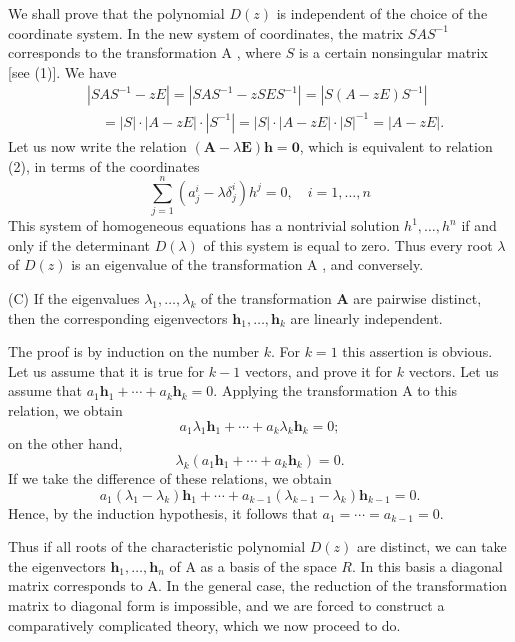 \documentclass[10pt,a5paper]{book}
\theoremstyle{plain}
\theoremstyle{definition}
\theoremstyle{remark}
\begin{document}
We shall prove that the polynomial $D(z)$ is independent of the choice of the coordinate system. In the new system of coordinates, the matrix $S A S^{-1}$ corresponds to the transformation A , where $S$ is a certain nonsingular matrix [see (1)]. We have
\[
\begin{aligned}
& \left|S A S^{-1}-z E\right|=\left|S A S^{-1}-z S E S^{-1}\right|=\left|S(A-z E) S^{-1}\right| \\
& \quad=|S| \cdot|A-z E| \cdot\left|S^{-1}\right|=|S| \cdot|A-z E| \cdot|S|^{-1}=|A-z E| .
\end{aligned}
\]
Let us now write the relation $(\mathbf{A}-\lambda \mathbf{E}) \mathbf{h}=\mathbf{0}$, which is equivalent to relation (2), in terms of the coordinates
\[
\sum_{j=1}^{n}\left(a_{j}^{i}-\lambda \delta_{j}^{i}\right) h^{j}=0, \quad i=1, \ldots, n
\]
This system of homogeneous equations has a nontrivial solution $h^{1}, \ldots, h^{n}$ if and only if the determinant $D(\lambda)$ of this system is equal to zero. Thus every root $\lambda$ of $D(z)$ is an eigenvalue of the transformation A , and conversely.

(C) If the eigenvalues $\lambda_{1}, \ldots, \lambda_{k}$ of the transformation $\mathbf{A}$ are pairwise distinct, then the corresponding eigenvectors $\mathbf{h}_{1}, \ldots, \mathbf{h}_{k}$ are linearly independent.

The proof is by induction on the number $k$. For $k=1$ this assertion is obvious. Let us assume that it is true for $k-1$ vectors, and prove it for $k$ vectors. Let us assume that $a_{1} \mathbf{h}_{1}+\cdots+a_{k} \mathbf{h}_{k}=0$. Applying the transformation A to this relation, we obtain
\[
a_{1} \lambda_{1} \mathbf{h}_{1}+\cdots+a_{k} \lambda_{k} \mathbf{h}_{k}=0 ;
\]
on the other hand,
\[
\lambda_{k}\left(a_{1} \mathbf{h}_{1}+\cdots+a_{k} \mathbf{h}_{k}\right)=0 .
\]
If we take the difference of these relations, we obtain
\[
a_{1}\left(\lambda_{1}-\lambda_{k}\right) \mathbf{h}_{1}+\cdots+a_{k-1}\left(\lambda_{k-1}-\lambda_{k}\right) \mathbf{h}_{k-1}=0 .
\]
Hence, by the induction hypothesis, it follows that $a_{1}=\cdots=a_{k-1}=0$.

Thus if all roots of the characteristic polynomial $D(z)$ are distinct, we can take the eigenvectors $\mathbf{h}_{1}, \ldots, \mathbf{h}_{n}$ of A as a basis of the space $R$. In this basis a diagonal matrix corresponds to A. In the general case, the reduction of the transformation matrix to diagonal form is impossible, and we are forced to construct a comparatively complicated theory, which we now proceed to do.
\end{document}
